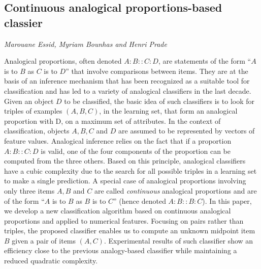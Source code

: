\documentclass[../booklet.tex]{subfiles}
\begin{document}
\subsection[Continuous analogical proportions-based classier. {\it Marouane Essid, Myriam Bounhas and Henri Prade}]{Continuous analogical proportions-based classier}
  

\begin{center}
  {\it Marouane Essid, Myriam Bounhas and Henri Prade}
\end{center}



Analogical proportions, often denoted $A:B::C:D$,  are statements of the form ``$A$ is to $B$ as $C$ is to $D$'' that involve comparisons between items. They are at the basis of an inference mechanism that has been recognized as a suitable tool for classification and has led to a variety of analogical classifiers in the last decade. Given an object $D$ to be classified, the basic idea of such classifiers is to look
for triples of examples $(A, B, C)$, in the learning set, that form an analogical proportion with D, on a maximum set of attributes. In the context of classification, objects $A, B, C$ and $D$ are assumed to be represented by vectors of feature values. Analogical inference relies on the fact that if a proportion $A:B::C:D$ is valid, one of the four components of the proportion can be computed from the three others. Based on this principle, analogical classifiers have a cubic complexity due to the search for all possible triples in a learning set to make a single prediction.
A special case of analogical proportions involving only three items $A, B$ and $C$ are called \textit{continuous} analogical proportions and are of the form ``$A$ is to $B$ as $B$ is to $C$'' (hence  denoted $A:B::B:C$). In this paper, we develop a new classification algorithm based on continuous analogical proportions and applied to numerical features. Focusing on pairs rather than triples, the proposed classifier enables us to compute an unknown midpoint item $B$ given a pair of items $(A,C)$. Experimental results of such classifier show an efficiency close to the previous analogy-based classifier while maintaining a reduced quadratic complexity.

\end{document}
